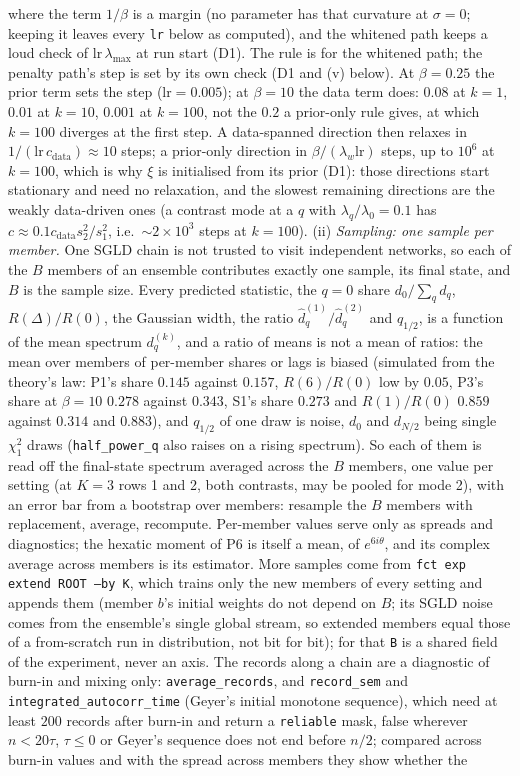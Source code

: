 \documentclass[11pt,a4paper]{article}
\newcommand{\code}[1]{\texttt{#1}}
\begin{document}
where the term $1/\beta$ is a margin (no parameter has that curvature at $\sigma = 0$; keeping it leaves every \code{lr} below as computed), and the whitened path keeps a loud check of $\mathrm{lr}\,\lambda_{\max}$ at run start (D1). The rule is for the whitened path; the penalty path's step is set by its own check (D1 and (v) below). At $\beta = 0.25$ the prior term sets the step ($\mathrm{lr} = 0.005$); at $\beta = 10$ the data term does: $0.08$ at $k = 1$, $0.01$ at $k = 10$, $0.001$ at $k = 100$, not the $0.2$ a prior-only rule gives, at which $k = 100$ diverges at the first step. A data-spanned direction then relaxes in $1/(\mathrm{lr}\,c_{\mathrm{data}})\approx10$ steps; a prior-only direction in $\beta/(\lambda_w\mathrm{lr})$ steps, up to $10^6$ at $k = 100$, which is why $\xi$ is initialised from its prior (D1): those directions start stationary and need no relaxation, and the slowest remaining directions are the weakly data-driven ones (a contrast mode at a $q$ with $\lambda_q/\lambda_0 = 0.1$ has $c\approx0.1c_{\mathrm{data}}s_2^2/s_1^2$, i.e.\ $\sim2\times10^3$ steps at $k = 100$). (ii) \emph{Sampling: one sample per member.} One SGLD chain is not trusted to visit independent networks, so each of the $B$ members of an ensemble contributes exactly one sample, its final state, and $B$ is the sample size. Every predicted statistic, the $q = 0$ share $d_0/\sum_qd_q$, $R(\Delta)/R(0)$, the Gaussian width, the ratio $\hat d^{(1)}_q/\hat d^{(2)}_q$ and $q_{1/2}$, is a function of the mean spectrum $d^{(k)}_q$, and a ratio of means is not a mean of ratios: the mean over members of per-member shares or lags is biased (simulated from the theory's law: P1's share $0.145$ against $0.157$, $R(6)/R(0)$ low by $0.05$, P3's share at $\beta = 10$ $0.278$ against $0.343$, S1's share $0.273$ and $R(1)/R(0)$ $0.859$ against $0.314$ and $0.883$), and $q_{1/2}$ of one draw is noise, $d_0$ and $d_{N/2}$ being single $\chi^2_1$ draws (\code{half\_power\_q} also raises on a rising spectrum). So each of them is read off the final-state spectrum averaged across the $B$ members, one value per setting (at $K = 3$ rows 1 and 2, both contrasts, may be pooled for mode 2), with an error bar from a bootstrap over members: resample the $B$ members with replacement, average, recompute. Per-member values serve only as spreads and diagnostics; the hexatic moment of P6 is itself a mean, of $e^{6i\theta}$, and its complex average across members is its estimator. More samples come from \code{fct exp extend ROOT --by K}, which trains only the new members of every setting and appends them (member $b$'s initial weights do not depend on $B$; its SGLD noise comes from the ensemble's single global stream, so extended members equal those of a from-scratch run in distribution, not bit for bit); for that \code{B} is a shared field of the experiment, never an axis. The records along a chain are a diagnostic of burn-in and mixing only: \code{average\_records}, and \code{record\_sem} and \code{integrated\_autocorr\_time} (Geyer's initial monotone sequence), which need at least $200$ records after burn-in and return a \code{reliable} mask, false wherever $n < 20\tau$, $\tau\le0$ or Geyer's sequence does not end before $n/2$; compared across burn-in values and with the spread across members they show whether the 
\end{document}
